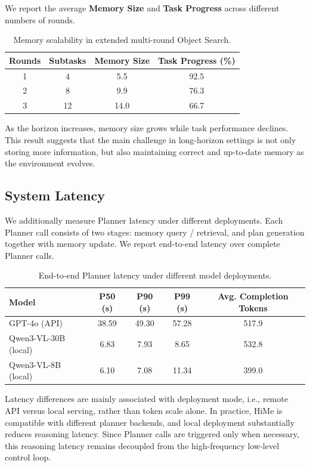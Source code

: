 We report the average \textbf{Memory Size} and \textbf{Task Progress} across different numbers of rounds.

\begin{table}[H]
\centering
\caption{Memory scalability in extended multi-round Object Search.}
\label{tab:memory_scalability}
\begin{tabular}{cccc}
\toprule
\textbf{Rounds} & \textbf{Subtasks} & \textbf{Memory Size} & \textbf{Task Progress (\%)} \\
\midrule
1 & 4  & 5.5  & 92.5 \\
2 & 8  & 9.9  & 76.3 \\
3 & 12 & 14.0 & 66.7 \\
\bottomrule
\end{tabular}
\end{table}

As the horizon increases, memory size grows while task performance declines. This result suggests that the main challenge in long-horizon settings is not only storing more information, but also maintaining correct and up-to-date memory as the environment evolves.

\subsection{System Latency}
\label{sec:system_latency}

We additionally measure Planner latency under different deployments. Each Planner call consists of two stages: memory query / retrieval, and plan generation together with memory update. We report end-to-end latency over complete Planner calls.

\begin{table}[H]
\centering
\caption{End-to-end Planner latency under different model deployments.}
\label{tab:system_latency}
\begin{tabular}{lcccc}
\toprule
\textbf{Model} & \textbf{P50 (s)} & \textbf{P90 (s)} & \textbf{P99 (s)} & \textbf{Avg. Completion Tokens} \\
\midrule
GPT-4o (API) & 38.59 & 49.30 & 57.28 & 517.9 \\
Qwen3-VL-30B (local) & 6.83 & 7.93 & 8.65 & 532.8 \\
Qwen3-VL-8B (local) & 6.10 & 7.08 & 11.34 & 399.0 \\
\bottomrule
\end{tabular}
\end{table}

Latency differences are mainly associated with deployment mode, i.e., remote API versus local serving, rather than token scale alone. In practice, HiMe is compatible with different planner backends, and local deployment substantially reduces reasoning latency. Since Planner calls are triggered only when necessary, this reasoning latency remains decoupled from the high-frequency low-level control loop.

